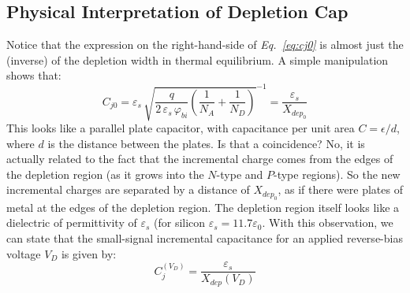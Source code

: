 \subsection{Physical Interpretation of Depletion Cap}
Notice that the expression on the right-hand-side of \emph{Eq.~\ref{eq:cj0}} is almost just the (inverse) of the depletion width in thermal equilibrium.  A simple manipulation shows that:
    \begin{equation} 
        C_{j0} = \varepsilon_s\,\sqrt{ \frac{q}{2\,\varepsilon_s\,\varphi_{bi}} \left( \frac{1}{N_A} + \frac{1}{N_D} \right) }^{-1} =
        \frac{\varepsilon_s}{X_{{dep}_0}}
    \end{equation}
This looks like a parallel plate capacitor, with capacitance per unit area $C = \epsilon/d$, where $d$ is the distance between the plates. Is that a coincidence?  No, it is actually related to the fact that the incremental charge comes from the edges of the depletion region (as it grows into the $N$-type and $P$-type regions).  So the new incremental charges are separated by a distance of $X_{{dep}_0}$, as if there were plates of metal at the edges of the depletion region.  The depletion region itself looks like a dielectric of permittivity of $\varepsilon_s$ (for silicon $\varepsilon_s = 11.7 \varepsilon_0$.  With this observation, we can state that the small-signal incremental capacitance for an applied reverse-bias voltage $V_D$ is given by:
    \begin{equation} 
        C_j^(V_D) = \frac{\varepsilon_s}{X_{dep}(V_D)} 
    \end{equation}
\newpage
